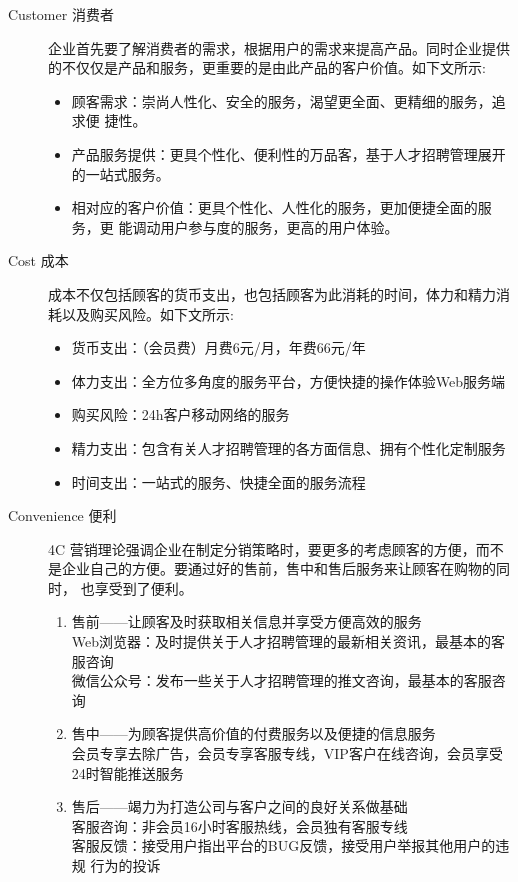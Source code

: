 \documentclass[UTF8]{ctexart}
\begin{document}
\begin{description}
	\item [Customer 消费者]
	      企业首先要了解消费者的需求，根据用户的需求来提高产品。同时企业提供 的不仅仅是产品和服务，更重要的是由此产品的客户价值。如下文所示:
	      \begin{itemize}
		      \item 顾客需求：崇尚人性化、安全的服务，渴望更全面、更精细的服务，追求便 捷性。
		      \item 产品服务提供：更具个性化、便利性的万品客，基于人才招聘管理展开的一站式服务。
		      \item 相对应的客户价值：更具个性化、人性化的服务，更加便捷全面的服务，更 能调动用户参与度的服务，更高的用户体验。
	      \end{itemize}
	\item[Cost 成本]
		成本不仅包括顾客的货币支出，也包括顾客为此消耗的时间，体力和精力消 耗以及购买风险。如下文所示:
		\begin{itemize}
			\item 货币支出：（会员费）月费6元/月，年费66元/年
			\item 体力支出：全方位多角度的服务平台，方便快捷的操作体验Web服务端
			\item 购买风险：24h客户移动网络的服务
			\item 精力支出：包含有关人才招聘管理的各方面信息、拥有个性化定制服务
			\item 时间支出：一站式的服务、快捷全面的服务流程
		\end{itemize}
		\item[Convenience 便利]4C 营销理论强调企业在制定分销策略时，要更多的考虑顾客的方便，而不 是企业自己的方便。要通过好的售前，售中和售后服务来让顾客在购物的同时， 也享受到了便利。
		\begin{enumerate}[1)]
			\item 售前——让顾客及时获取相关信息并享受方便高效的服务 \\Web浏览器：及时提供关于人才招聘管理的最新相关资讯，最基本的客服咨询
			      \\微信公众号：发布一些关于人才招聘管理的推文咨询，最基本的客服咨询
			\item 售中——为顾客提供高价值的付费服务以及便捷的信息服务 \\会员专享去除广告，会员专享客服专线，VIP客户在线咨询，会员享受24时智能推送服务
			\item 售后——竭力为打造公司与客户之间的良好关系做基础
			      \\客服咨询：非会员16小时客服热线，会员独有客服专线
			      \\客服反馈：接受用户指出平台的BUG反馈，接受用户举报其他用户的违规 行为的投诉

\end{enumerate}
\end{description}
\end{document}
